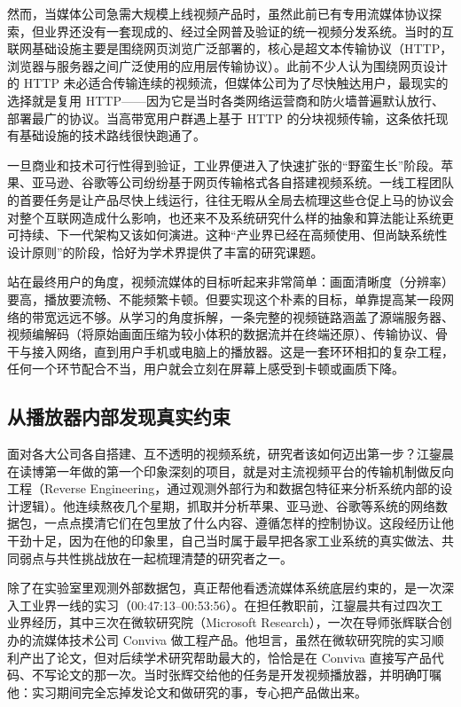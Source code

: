 \documentclass[UTF8,a4paper,11pt,fontset=fandol]{ctexart}
\begin{document}
然而，当媒体公司急需大规模上线视频产品时，虽然此前已有专用流媒体协议探索，但业界还没有一套现成的、经过全网普及验证的统一视频分发系统。当时的互联网基础设施主要是围绕网页浏览广泛部署的，核心是超文本传输协议（HTTP，浏览器与服务器之间广泛使用的应用层传输协议）。此前不少人认为围绕网页设计的 HTTP 未必适合传输连续的视频流，但媒体公司为了尽快触达用户，最现实的选择就是复用 HTTP——因为它是当时各类网络运营商和防火墙普遍默认放行、部署最广的协议。当高带宽用户群遇上基于 HTTP 的分块视频传输，这条依托现有基础设施的技术路线很快跑通了。

一旦商业和技术可行性得到验证，工业界便进入了快速扩张的“野蛮生长”阶段。苹果、亚马逊、谷歌等公司纷纷基于网页传输格式各自搭建视频系统。一线工程团队的首要任务是让产品尽快上线运行，往往无暇从全局去梳理这些仓促上马的协议会对整个互联网造成什么影响，也还来不及系统研究什么样的抽象和算法能让系统更可持续、下一代架构又该如何演进。这种“产业界已经在高频使用、但尚缺系统性设计原则”的阶段，恰好为学术界提供了丰富的研究课题。

站在最终用户的角度，视频流媒体的目标听起来非常简单：画面清晰度（分辨率）要高，播放要流畅、不能频繁卡顿。但要实现这个朴素的目标，单靠提高某一段网络的带宽远远不够。从学习的角度拆解，一条完整的视频链路涵盖了源端服务器、视频编解码（将原始画面压缩为较小体积的数据流并在终端还原）、传输协议、骨干与接入网络，直到用户手机或电脑上的播放器。这是一套环环相扣的复杂工程，任何一个环节配合不当，用户就会立刻在屏幕上感受到卡顿或画质下降。

\subsection{从播放器内部发现真实约束}
面对各大公司各自搭建、互不透明的视频系统，研究者该如何迈出第一步？江鋆晨在读博第一年做的第一个印象深刻的项目，就是对主流视频平台的传输机制做反向工程（Reverse Engineering，通过观测外部行为和数据包特征来分析系统内部的设计逻辑）。他连续熬夜几个星期，抓取并分析苹果、亚马逊、谷歌等系统的网络数据包，一点点摸清它们在包里放了什么内容、遵循怎样的控制协议。这段经历让他干劲十足，因为在他的印象里，自己当时属于最早把各家工业系统的真实做法、共同弱点与共性挑战放在一起梳理清楚的研究者之一。

除了在实验室里观测外部数据包，真正帮他看透流媒体系统底层约束的，是一次深入工业界一线的实习（00:47:13–00:53:56）。在担任教职前，江鋆晨共有过四次工业界经历，其中三次在微软研究院（Microsoft Research），一次在导师张辉联合创办的流媒体技术公司 Conviva 做工程产品。他坦言，虽然在微软研究院的实习顺利产出了论文，但对后续学术研究帮助最大的，恰恰是在 Conviva 直接写产品代码、不写论文的那一次。当时张辉交给他的任务是开发视频播放器，并明确叮嘱他：实习期间完全忘掉发论文和做研究的事，专心把产品做出来。
\end{document}
